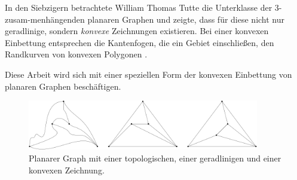 In den Siebzigern betrachtete William Thomas Tutte die Unterklasse der 3-zusam-menhängenden planaren Graphen und zeigte, dass für diese nicht nur geradlinige, sondern \textit{konvexe} Zeichnungen existieren. Bei einer konvexen Einbettung entsprechen die Kantenfogen, die ein Gebiet einschließen, den Randkurven von konvexen Polygonen \cite{tutte63}.

Diese Arbeit wird sich mit einer speziellen Form der konvexen Einbettung von planaren Graphen beschäftigen.

\begin{figure}
	\centering
  \includegraphics[width=0.9\textwidth]{topo_straight_convex.png}
	\caption{Planarer Graph mit einer topologischen, einer geradlinigen und einer konvexen Zeichnung.}
	\label{topo_straight_convex}
\end{figure}





